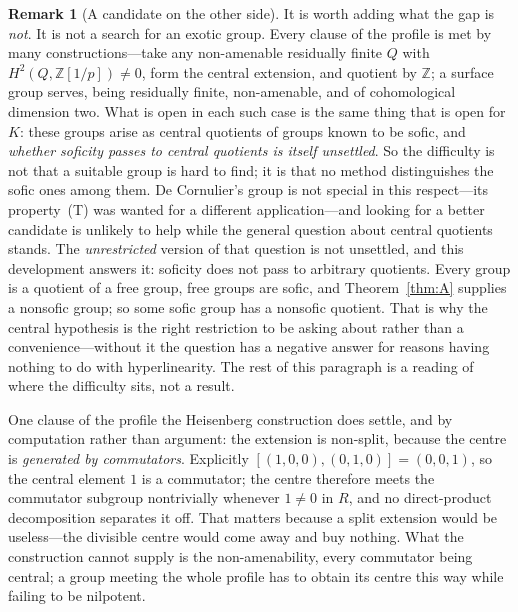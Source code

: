 \documentclass[11pt]{amsart}
\theoremstyle{definition}
\newtheorem{remark}[theorem]{Remark}
\theoremstyle{plain}
\newcommand{\Z}{\mathbb Z}
\begin{document}
\begin{remark}[A candidate on the other side]
It is worth adding what the gap is \emph{not}.  It is not a search for an exotic group.  Every clause of the profile is met by many constructions---take any non-amenable residually finite \(Q\) with \(H^2(Q,\Z[1/p])\neq0\), form the central extension, and quotient by \(\Z\); a surface group serves, being residually finite, non-amenable, and of cohomological dimension two.  What is open in each such case is the same thing that is open for \(K\): these groups arise as central quotients of groups known to be sofic, and \emph{whether soficity passes to central quotients is itself unsettled}.  So the difficulty is not that a suitable group is hard to find; it is that no method distinguishes the sofic ones among them.  De Cornulier's group is not special in this respect---its property~(T) was wanted for a different application---and looking for a better candidate is unlikely to help while the general question about central quotients stands.  The \emph{unrestricted} version of that question is not unsettled, and this development answers it: soficity does not pass to arbitrary quotients.  Every group is a quotient of a free group, free groups are sofic, and Theorem~\ref{thm:A} supplies a nonsofic group; so some sofic group has a nonsofic quotient.  That is why the central hypothesis is the right restriction to be asking about rather than a convenience---without it the question has a negative answer for reasons having nothing to do with hyperlinearity.  The rest of this paragraph is a reading of where the difficulty sits, not a result.

One clause of the profile the Heisenberg construction does settle, and by computation rather than argument: the extension is non-split, because the centre is \emph{generated by commutators}.  Explicitly \([(1,0,0),(0,1,0)]=(0,0,1)\), so the central element \(1\) is a commutator; the centre therefore meets the commutator subgroup nontrivially whenever \(1\neq0\) in \(R\), and no direct-product decomposition separates it off.  That matters because a split extension would be useless---the divisible centre would come away and buy nothing.  What the construction cannot supply is the non-amenability, every commutator being central; a group meeting the whole profile has to obtain its centre this way while failing to be nilpotent.


\end{remark}
\end{document}
